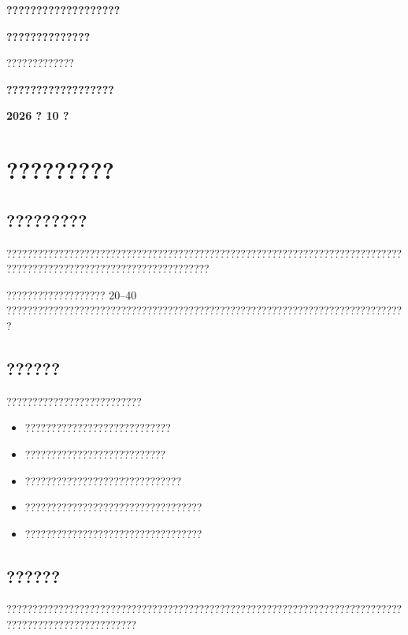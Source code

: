 

\thispagestyle{fancy}
\vspace*{0.8cm}
\begin{center}
{\heiti\bfseries{} ???????????????????\par}
\vspace{3.8cm}
{\heiti\bfseries{}??????????????\par}
\vspace{1.2cm}
{\heiti{}?????????????\par}
\vfill
{\heiti\bfseries{}??????????????????\par}
\vspace{0.8cm}
{\heiti\bfseries{}2026 ? 10 ?\par}
\end{center}
\newpage

\thispagestyle{fancy}
\tableofcontents
\newpage
\listoffigures
\newpage
\listoftables
\newpage

\section{?????????}

\subsection{?????????}
???????????????????????????????????????????????????????????????????????????????????????????????????????????????????

??????????????????? 20--40 ?????????????????????????????????????????????????????????????????????????????

\subsection{??????}
??????????????????????????
\begin{itemize}
  \item ????????????????????????????
  \item ???????????????????????????
  \item ??????????????????????????????
  \item ??????????????????????????????????
  \item ??????????????????????????????????
\end{itemize}

\subsection{??????}
?????????????????????????????????????????????????????????????????????????????????????????????????????

